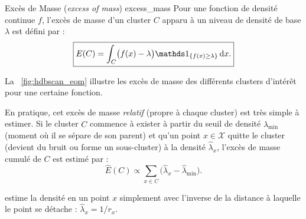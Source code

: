 \begin{Definition}{Excès de Masse (\emph{excess of mass}) \cite{HDBSCAN}}{excess_mass}
Pour une fonction de densité continue $f$, l'excès de masse d'un cluster $C$ apparu à un niveau de densité de base $\lambda$ est défini par :
\[
\boxed{
    E(C) = \int_C \bigl(f(x) - \lambda\bigr) \ind{f(x) \ge \lambda} \, \mathrm{d}x.
    }
\]
\end{Definition}

La \Fig~\ref{fig:hdbscan_eom} illustre les excès de masse des différents clusters d'intérêt pour une certaine fonction.

En pratique, cet excès de masse \emph{relatif} (propre à chaque cluster) est très simple à estimer. %
Si le cluster $C$ commence à exister à partir du seuil de densité $\hat{\lambda}_{\min}$ (moment où il se sépare de son parent) et qu'un point $x \in \mathcal X$ quitte le cluster (devient du bruit ou forme un sous-cluster) à la densité $\hat{\lambda}_x$, l'excès de masse cumulé de $C$ est estimé par :
\[
    \widehat{E}(C) \propto \sum_{x \in C} \bigl(\hat{\lambda}_x - \hat{\lambda}_{\min}\bigr).
\]

\HDBSCAN estime la densité en un point $x$ simplement avec l'inverse de la distance à laquelle le point se détache : $\hat{\lambda}_x = 1/r_x$.



